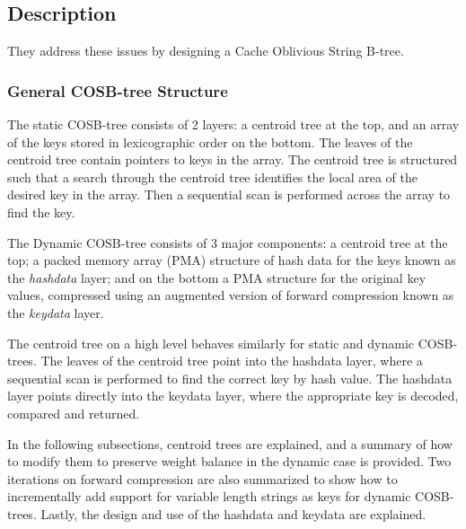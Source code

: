 \documentclass{style}
\begin{document}
\subsection{Description}
They address these issues by designing a Cache Oblivious String B-tree.

\subsubsection{General COSB-tree Structure}
The static COSB-tree consists of 2 layers: a centroid tree at the top, and an array of the keys stored in lexicographic order on the bottom. The leaves of the centroid tree contain pointers to keys in the array. The centroid tree is structured such that a search through the centroid tree identifies the local area of the desired key in the array. Then a sequential scan is performed across the array to find the key.

The Dynamic COSB-tree consists of 3 major components: a centroid tree at the top; a packed memory array (PMA) structure of hash data for the keys known as the \emph{hashdata} layer; and on the bottom a PMA structure for the original key values, compressed using an augmented version of forward compression known as the \emph{keydata} layer.

The centroid tree on a high level behaves similarly for static and dynamic COSB-trees. The leaves of the centroid tree point into the hashdata layer, where a sequential scan is performed to find the correct key by hash value. The hashdata layer points directly into the keydata layer, where the appropriate key is decoded, compared and returned.

In the following subsections, centroid trees are explained, and a summary of how to modify them to preserve weight balance in the dynamic case is provided. Two iterations on forward compression are also summarized to show how to incrementally add support for variable length strings as keys for dynamic COSB-trees. Lastly, the design and use of the hashdata and keydata are explained.
\end{document}
